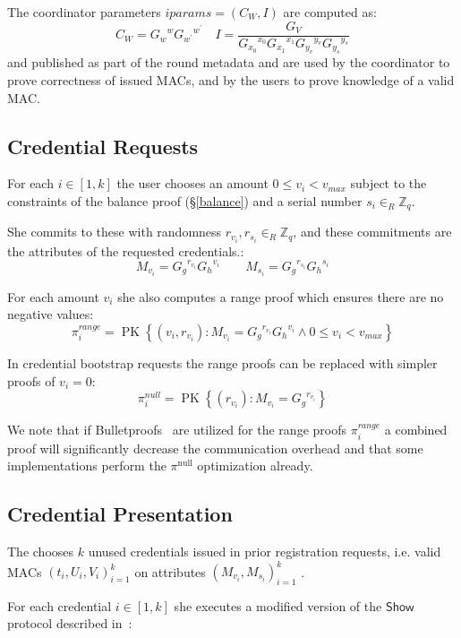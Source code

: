 \documentclass{article}
\begin{document}
The coordinator parameters
$\mathit{iparams} =  (C_{W}, I)$
are computed as:
\[
C_{W}={G_w}^{w} {G_{w^\prime}}^{w^\prime}
\quad
I=\frac{G_{V}}{{G_{x_0}}^{x_0} {G_{x_1}}^{x_1} {G_{y_v}}^{y_v} {G_{y_s}}^{y_s}}
\]
and published as part of the round metadata and are used by the coordinator to prove correctness of issued MACs, and by the users to prove knowledge of a valid MAC.

\subsection{Credential Requests}

For each $i \in [1, k]$ the user chooses an amount $0 \leq v_i < v_{\mathit{max}}$ subject to the constraints of the balance proof (\S\ref{balance}) and a serial number $s_i \in_R \mathbb{Z}_q$.

She commits to these with randomness $r_{v_i}, r_{s_i} \in_R \mathbb{Z}_q$, and these commitments are the attributes of the requested credentials.:
\[ M_{v_i}={G_g}^{r_{v_i}}{G_h}^{v_i} \qquad M_{s_i}={G_g}^{r_{s_i}}{G_h}^{s_i} \]

For each amount $v_i$ she also computes a range proof which ensures there are no negative values:
\[
\pi^{\mathit{range}}_i = \operatorname{PK}\left\{\left(v_i, r_{v_i} \right) :
M_{v_i} = {G_g}^{r_{v_i}}{G_h}^{v_i}
\land
0 \leq v_i < v_{\mathit{max}} \right\}
\]

In credential bootstrap requests the range proofs can be replaced with simpler proofs of $v_i = 0$:
\[
  \pi^{\mathit{null}}_i = \operatorname{PK}\left\{ \left( r_{v_i}\right) :
    M_{v_i} = {G_{g}}^{r_{v_i}}
  \right\}
\]

We note that if Bulletproofs~\cite{bunz2018bulletproofs} are utilized for the range proofs $\pi^{\textit{range}}_i$ a combined proof will significantly decrease the communication overhead and that some implementations perform the $\pi^{\mathrm{null}}$ optimization already.

\subsection{Credential Presentation}

The chooses $k$ unused credentials issued in prior registration requests, i.e. valid MACs $(t_i,U_i,V_i)_{i=1}^k$ on attributes $(M_{v_i}, M_{s_i})_{i=1}^k$ .

For each credential $i \in [1, k]$ she executes a modified version of the $\mathsf{Show}$ protocol described in~\cite{chase2019signal}:
\end{document}
